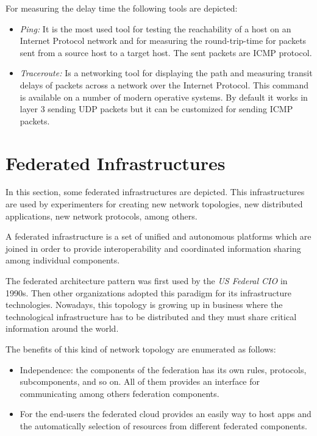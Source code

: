 For measuring the delay time the following tools are depicted:
\begin{itemize}
\item \emph{Ping:} It is the most used tool for testing the reachability of a host on an
  Internet Protocol network and for measuring the round-trip-time for packets sent
  from a source host to a target host. The sent packets are \ac{ICMP} protocol.
\item \emph{Traceroute:} Is a networking tool for displaying the path and
  measuring transit delays of packets across a network over the Internet
  Protocol. This command is available on a number of modern operative systems. By
  default it works in layer 3 sending \ac{UDP} packets but it can be customized
  for sending \ac{ICMP} packets.
\end{itemize}

\section{Federated Infrastructures}

In this section, some federated infrastructures are depicted. This
infrastructures are used by experimenters for creating new network topologies,
new distributed applications, new network protocols, among others.

A federated infrastructure is a set of unified and autonomous platforms which
are joined in order to provide interoperability and coordinated
information sharing among individual components. 

The federated architecture pattern was first used by the \emph{US Federal CIO} in
1990s. Then other organizations adopted this paradigm for its infrastructure
technologies. Nowadays, this topology is growing up in business where the
technological infrastructure has to be distributed and they must share critical
information around the world.

The benefits of this kind of network topology are enumerated as follows:
\begin{itemize}
\item Independence: the components of the federation has its own rules,
  protocols, subcomponents, and so on. All of them provides an interface for
  communicating among others federation components.
\item For the end-users the federated cloud provides an easily way to host apps
  and the automatically selection of resources from different federated components.
\end{itemize}

